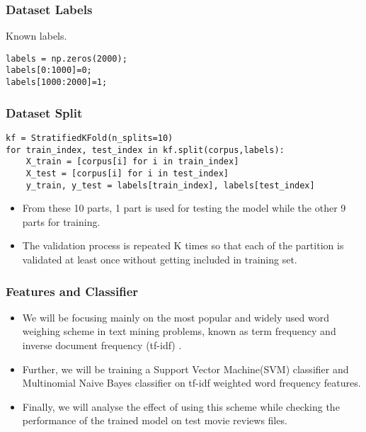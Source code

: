 \begin{frame}[fragile]\frametitle{Dataset Labels}
Known labels.
    \begin{lstlisting}
labels = np.zeros(2000);
labels[0:1000]=0;
labels[1000:2000]=1; 
    \end{lstlisting}
\end{frame}
        

\begin{frame}[fragile]\frametitle{Dataset Split}
    \begin{lstlisting}
kf = StratifiedKFold(n_splits=10)
for train_index, test_index in kf.split(corpus,labels):
    X_train = [corpus[i] for i in train_index]
    X_test = [corpus[i] for i in test_index]
    y_train, y_test = labels[train_index], labels[test_index]
    \end{lstlisting}
   \begin{itemize}
  \item  From these 10 parts, 1 part is used for testing the model while the other 9 parts for training. 
  \item The validation process is repeated K times so that each of the partition is validated at least once without getting included in training set.
    \end{itemize}
\end{frame}

\begin{frame}[fragile]\frametitle{Features and Classifier}
  \begin{itemize}
  \item We will be focusing mainly on the most popular and widely used word weighing scheme in text mining problems, known as term frequency and inverse document frequency (tf-idf) . 
  \item Further, we will be training a Support Vector Machine(SVM) classifier and Multinomial Naive Bayes classifier on tf-idf weighted word frequency features. 
  \item Finally, we will analyse the effect of using this scheme while checking the performance of the trained model on test movie reviews files.
  \end{itemize}
\end{frame}

